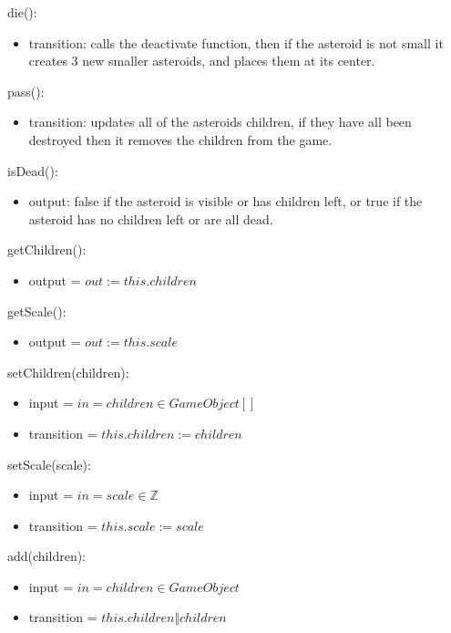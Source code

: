 \documentclass[12pt]{article}
\begin{document}
die():
\begin{itemize}
    \item transition: calls the deactivate function, then if the asteroid is not small it creates 3 new smaller asteroids, and places them at its center.
\end{itemize}

pass():
\begin{itemize}
    \item transition: updates all of the asteroids children, if they have all been destroyed then it removes the children from the game. 
\end{itemize}

isDead():
\begin{itemize}
    \item output: false if the asteroid is visible or has children left, or true if the asteroid has no children left or are all dead.
\end{itemize}

getChildren():
\begin{itemize}
    \item output = $out := this.children$
\end{itemize}

getScale():
\begin{itemize}
    \item output = $out := this.scale$
\end{itemize}

setChildren(children):
\begin{itemize}
    \item input = $in = children \in GameObject[]$
    \item transition = $this.children := children$
\end{itemize}

setScale(scale):
\begin{itemize}
    \item input = $in = scale \in \mathbb{Z}$
    \item transition = $this.scale := scale$
\end{itemize}

add(children):
\begin{itemize}
    \item input = $in = children \in GameObject$
    \item transition = $this.children \Vert children$
\end{itemize}


\end{document}
